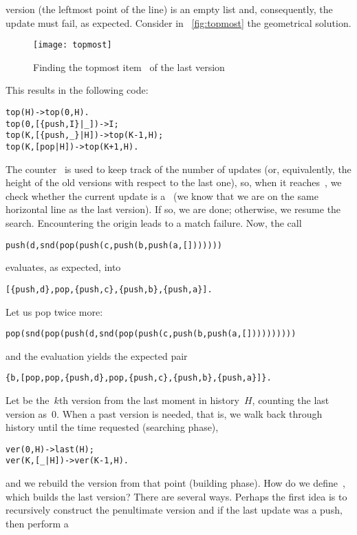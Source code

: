 version (the leftmost point of the line) is an empty list and,
consequently, the~ update must fail, as
expected. Consider in \fig~\vref{fig:topmost} the geometrical
solution.
\begin{figure}[!t]
\centering
\texttt{[image: topmost]}
\caption{Finding the topmost item~ of the last version
\label{fig:topmost}}
\end{figure}
This results in the following code:
\begin{alltt}
top(H)              -> top(0,H).
top(0,[\{push,I\}|\_]) -> I;
top(K,[\{push,\_\}|H]) -> top(K-1,H);
top(K,     [pop|H]) -> top(K+1,H).
\end{alltt}
The counter~ is used to keep track of the number
of  updates (or, equivalently, the height of the old
versions with respect to the last one), so, when it
reaches~, we check whether the current update is
a~ (we know that we are on the same horizontal line as
the last version). If so, we are done; otherwise, we resume the
search. Encountering the origin leads to a match failure. Now, the
call
\begin{center}
\texttt{push(d,snd(pop(push(c,push(b,push(a,[]))))))}
\end{center}
evaluates, as expected, into
\begin{center}
\texttt{[\{push,d\},pop,\{push,c\},\{push,b\},\{push,a\}].}
\end{center}
Let us pop twice more:
\begin{alltt}
pop(snd(pop(push(d,snd(pop(push(c,push(b,push(a,[])))))))))
\end{alltt}
and the evaluation yields the expected pair
\begin{center}
\texttt{\{b,[pop,pop,\{push,d\},pop,\{push,c\},\{push,b\},\{push,a\}]\}.}
\end{center}
Let  be the~\(k\)th version from the last
moment in history~\(H\), counting the last version as~\(0\). When a
past version is needed, that is, we walk back through history until
the time requested (searching phase),
\begin{alltt}
% Searching
ver(0,    H) -> last(H);
ver(K,[_|H]) -> ver(K-1,H).
\end{alltt}
and we rebuild the version from that point (building phase). How do we
define~, which builds the last version? There are
several ways. Perhaps the first idea is to recursively construct the
penultimate version and if the last update was a push, then perform a
